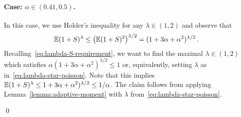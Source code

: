       \paragraph{Case: $\alpha \in (0.41, 0.5)$.}
      In this case, we use Holder's inequality for any $\lambda \in (1,2)$ 
      and observe that 
      $$
          \operatorname{\mathbb{E}} (1+S)^\lambda 
          \leq \left( \operatorname{\mathbb{E}} (1+S)^2 \right)^{\lambda/2} 
          = (1 + 3\alpha +\alpha^2)^{\lambda/2}
          \,.
      $$
      Recalling~\eqref{eq:lambda-S-requirement}, 
      we want to find the maximal $\lambda \in (1, 2)$ 
      which satisfies $\alpha(1 + 3\alpha +\alpha^2)^{\lambda/2} \leq 1$ or, 
      equivalently, setting $\lambda$ as in~\eqref{eq:lambda-star-poisson}. 
      Note that this implies $\operatorname{\mathbb{E}} (1+S)^\lambda \leq 1 + 3\alpha +\alpha^2)^{\lambda/2} \leq 1/\alpha$.
      The claim follows from applying Lemma~\ref{lemma:adaptive-moment} 
      with $\lambda$ from~\eqref{eq:lambda-star-poisson}. 


  \hfill\qed




































